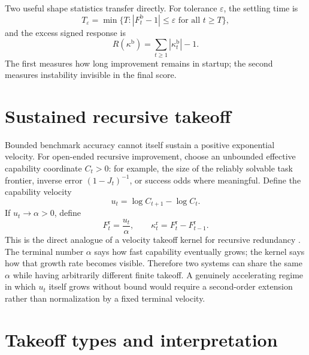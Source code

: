 \documentclass[10pt,twocolumn]{article}
\begin{document}
Two useful shape statistics transfer directly.  For tolerance $\varepsilon$,
the settling time is
\begin{equation}
T_\varepsilon=\min\{T:|F_t^{\mathrm b}-1|\le\varepsilon
\text{ for all }t\ge T\},
\end{equation}
and the excess signed response is
\begin{equation}
R(\kappa^{\mathrm b})=\sum_{t\ge1}|\kappa_t^{\mathrm b}|-1.
\end{equation}
The first measures how long improvement remains in startup; the second measures
instability invisible in the final score.

\section{Sustained recursive takeoff}

Bounded benchmark accuracy cannot itself sustain a positive exponential
velocity.  For open-ended recursive improvement, choose an unbounded effective
capability coordinate $C_t>0$: for example, the size of the reliably solvable
task frontier, inverse error $(1-J_t)^{-1}$, or success odds where meaningful.
Define the capability velocity
\begin{equation}
u_t=\log C_{t+1}-\log C_t.
\end{equation}
If $u_t\to\alpha>0$, define
\begin{equation}
F_t^{\mathrm r}=\frac{u_t}{\alpha},
\qquad
\kappa_t^{\mathrm r}=F_t^{\mathrm r}-F_{t-1}^{\mathrm r}.
\end{equation}
This is the direct analogue of a velocity takeoff kernel for recursive
redundancy \cite{landers2026}.  The terminal number $\alpha$ says how fast
capability eventually grows; the kernel says how that growth rate becomes
visible.  Therefore two systems can share the same $\alpha$ while having
arbitrarily different finite takeoff.  A genuinely accelerating regime in
which $u_t$ itself grows without bound would require a second-order extension
rather than normalization by a fixed terminal velocity.

\section{Takeoff types and interpretation}
\end{document}

